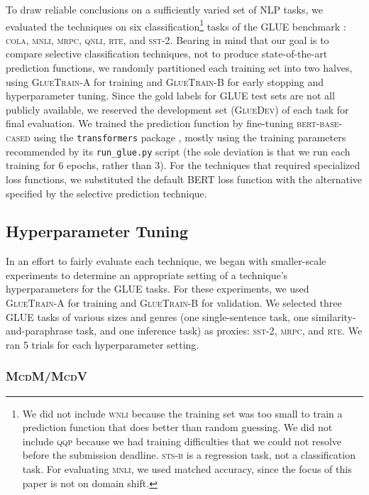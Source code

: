 \documentclass[11pt]{article}
\begin{document}
To draw reliable conclusions on a sufficiently varied set of NLP tasks, we evaluated the techniques on six classification\footnote{We did not include \textsc{wnli} because the training set was too small to train a prediction function that does better than random guessing. We did not include \textsc{qqp} because we had training difficulties that we could not resolve before the submission deadline. \textsc{sts-b} is a regression task, not a classification task. For evaluating \textsc{mnli}, we used matched accuracy, since the focus of this paper is not on domain shift.} tasks of the \textsc{GLUE} benchmark \cite{wang-etal-2018-glue}: \textsc{cola}, \textsc{mnli}, \textsc{mrpc}, \textsc{qnli}, \textsc{rte}, and \textsc{sst-2}. Bearing in mind that our goal is to compare selective classification techniques, not to produce state-of-the-art prediction functions, we randomly partitioned each training set into two halves, using \textsc{GlueTrain-A} for training and \textsc{GlueTrain-B} for early stopping and hyperparameter tuning. Since the gold labels for GLUE test sets are not all publicly available, we reserved the development set (\textsc{GlueDev}) of each task for final evaluation. We trained the prediction function by fine-tuning \textsc{bert-base-cased} using the \texttt{transformers} package \cite{wolf-etal-2020-transformers}, mostly using the training parameters recommended by its \texttt{run\_glue.py} script (the sole deviation is that we run each training for 6 epochs, rather than 3). For the techniques that required specialized loss functions, we substituted the default \textsc{BERT} loss function with the alternative specified by the selective prediction technique. 

\subsection{Hyperparameter Tuning}

In an effort to fairly evaluate each technique, we began with smaller-scale experiments to determine an appropriate setting of a technique's hyperparameters for the \textsc{GLUE} tasks. For these experiments, we used \textsc{GlueTrain-A} for training and \textsc{GlueTrain-B} for validation. We selected three \textsc{GLUE} tasks of various sizes and genres (one single-sentence task, one similarity-and-paraphrase task, and one inference task) as proxies: \textsc{sst-2}, \textsc{mrpc}, and \textsc{rte}. We ran 5 trials for each hyperparameter setting.

\subsubsection*{\textsc{McdM/McdV}}
\end{document}
